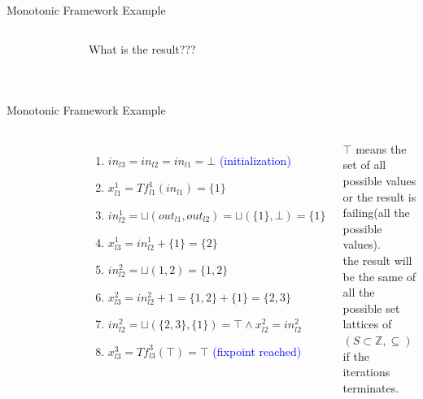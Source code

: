 \begin{frame}{Monotonic Framework Example}

\begin{columns}
	\begin{figure}
		\centering\\
		\vspace{1cm}
		\centering
	\end{figure}

	What is the result???
	
\end{columns}
\end{frame}

\begin{frame}{Monotonic Framework Example}

\begin{columns}
	\begin{figure}
	\centering\\
	\vspace{1cm}
	\centering
    \end{figure}
	\begin{enumerate}\scriptsize
		\item $ \scriptstyle in_{l3}=in_{l2}=in_{l1}=\bot$ \scriptsize \textcolor{blue}{(initialization)}
		\item $ \scriptstyle  x_{l1}^1 =Tf_{l1}^1 (in_{l1})= \{1\}$
		\item $ \scriptstyle in_{l2}^1 = \sqcup(out_{l1},out_{l2})=\sqcup(\{1\}, \bot) =\{1\} $
		\item $ \scriptstyle x_{l3}^1= in_{l2}^1+ \{1\} = \{2\} $
		\item $ \scriptstyle in_{l2}^2 = \sqcup(1, 2) = \{1,2\}$
		\item $ \scriptstyle x_{l3}^2= in_{l2}^2+1 = \{1,2\} + \{1\} =\{2,3\}$
		\item $ \scriptstyle in_{l2}^2 = \sqcup(\{2,3\}, \{1\}) = \top \wedge x_{l2}^2=in_{l2}^2 $
		\item $\scriptstyle x_{l3}^3 =Tf_{l3}^3(\top)=\top $ \scriptsize \textcolor{blue}{(fixpoint reached) }
	\end{enumerate}
     \scriptsize
     $\top$ means the set of all possible values or the result is failing(all the possible values).\\
     the result will be the same of all the possible set lattices of $ ( S \subset \mathbb{Z}, \subseteq)$ if the iterations terminates. 
     
\end{columns}
\end{frame}

